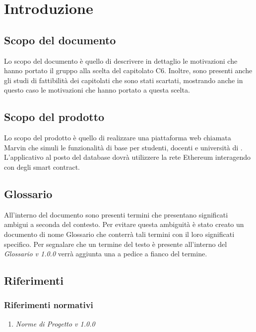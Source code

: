 \documentclass[StudioDiFattibilità.tex]{subfiles}
\begin{document}
\chapter{Introduzione}
\section{Scopo del documento}
Lo scopo del documento è quello di descrivere in dettaglio le motivazioni che hanno portato il gruppo alla scelta del capitolato C6. Inoltre, sono presenti anche gli studi di fattibilità dei capitolati che sono stati scartati, mostrando anche in questo caso le motivazioni che hanno portato a questa scelta.
\section{Scopo del prodotto}
Lo scopo del prodotto è quello di realizzare una piattaforma web chiamata Marvin che simuli le funzionalità di base per studenti, docenti e università di . L'applicativo al posto del database dovrà utilizzere la rete Ethereum interagendo con degli smart contract.
\section{Glossario}
All'interno del documento sono presenti termini che presentano significati ambigui a seconda del contesto. Per evitare questa ambiguità è stato creato un documento di nome Glossario che conterrà tali termini con il loro significati specifico. Per segnalare che un termine del testo è presente all'interno del \textit{Glossario v 1.0.0} verrà aggiunta una \Glossario{} a pedice a fianco del termine.
\section{Riferimenti}
\subsection{Riferimenti normativi}
\begin{enumerate}
	\item \textit{Norme di Progetto v 1.0.0}
\end{enumerate}
\end{document}
